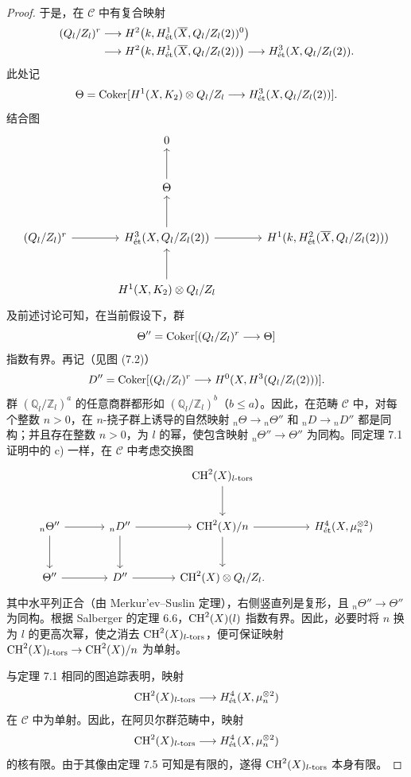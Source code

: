 \begin{proof}
于是，在 $\mathcal C$ 中有复合映射
\[
\begin{split}
 (Q_l/Z_l)^r
 &\longrightarrow H^2\bigl(k,H^1_{\mathrm{\acute et}}(\overline X,Q_l/Z_l(2))^0\bigr)\\
 &\longrightarrow H^2\bigl(k,H^1_{\mathrm{\acute et}}(\overline X,Q_l/Z_l(2))\bigr)
 \longrightarrow H^3_{\mathrm{\acute et}}(X,Q_l/Z_l(2)).
\end{split}
\]
此处记
\[
 \Theta=\operatorname{Coker}[H^1(X,K_2)\otimes Q_l/Z_l
 \longrightarrow H^3_{\mathrm{\acute et}}(X,Q_l/Z_l(2))].
\]
结合图
\[
\resizebox{.98\linewidth}{!}{$
\begin{tikzcd}[ampersand replacement=\&,row sep=large,column sep=large]
 \&0\\
 \&\Theta\arrow[u]\\
 (\mathbb Q_l/\mathbb Z_l)^r\arrow[r]
 \&H^3_{\et}(X,\mathbb Q_l/\mathbb Z_l(2))\arrow[u]\arrow[r]
 \&H^1(k,H^2_{\et}(\overline X,\mathbb Q_l/\mathbb Z_l(2)))\\
 \&H^1(X,\mathcal K_2)\otimes\mathbb Q_l/\mathbb Z_l\arrow[u]
\end{tikzcd}$}
\]
及前述讨论可知，在当前假设下，群
\[
 \Theta''=\operatorname{Coker}[(Q_l/Z_l)^r\longrightarrow\Theta]
\]
指数有界。再记（见图 (7.2)）
\[
 D''=\operatorname{Coker}[(Q_l/Z_l)^r
 \longrightarrow H^0(X,H^3(Q_l/Z_l(2)))].
\]
群 $(\mathbb Q_l/\mathbb Z_l)^a$ 的任意商群都形如 $(\mathbb Q_l/\mathbb Z_l)^b$（$b\le a$）。因此，在范畴 $\mathcal C$ 中，对每个整数 $n>0$，在 $n$-挠子群上诱导的自然映射 ${}_n\Theta\to{}_n\Theta''$ 和 ${}_nD\to{}_nD''$ 都是同构；并且存在整数 $n>0$，为 $l$ 的幂，使包含映射 ${}_n\Theta''\to\Theta''$ 为同构。同定理 7.1 证明中的 c) 一样，在 $\mathcal C$ 中考虑交换图
\[
\begin{tikzcd}[ampersand replacement=\&,column sep=large,row sep=large]
 \&\&\CH^2(X)_{l\text{-}\tors}\arrow[d]\\
 {}_n\Theta''\arrow[r]\arrow[d]\&{}_nD''\arrow[r]\arrow[d]
 \&\CH^2(X)/n\arrow[r]\arrow[d]\&H^4_{\et}(X,\mu_n^{\otimes2})\\
 \Theta''\arrow[r]\&D''\arrow[r]\&\CH^2(X)\otimes\mathbb Q_l/\mathbb Z_l.
\end{tikzcd}
\]
其中水平列正合（由 Merkur'ev--Suslin 定理），右侧竖直列是复形，且 ${}_n\Theta''\to\Theta''$ 为同构。根据 Salberger 的定理 6.6，$\operatorname{CH}^2(X)(l)$ 指数有界。因此，必要时将 $n$ 换为 $l$ 的更高次幂，使之消去 $\operatorname{CH}^2(X)_{l\text{-}\mathrm{tors}}$，便可保证映射 $\operatorname{CH}^2(X)_{l\text{-}\mathrm{tors}}\to\operatorname{CH}^2(X)/n$ 为单射。

与定理 7.1 相同的图追踪表明，映射
\[
 \operatorname{CH}^2(X)_{l\text{-}\mathrm{tors}}\longrightarrow H^4_{\mathrm{\acute et}}(X,\mu_n^{\otimes2})
\]
在 $\mathcal C$ 中为单射。因此，在阿贝尔群范畴中，映射
\[
 \operatorname{CH}^2(X)_{l\text{-}\mathrm{tors}}\longrightarrow H^4_{\mathrm{\acute et}}(X,\mu_n^{\otimes2})
\]
的核有限。由于其像由定理 7.5 可知是有限的，遂得 $\operatorname{CH}^2(X)_{l\text{-}\mathrm{tors}}$ 本身有限。
\end{proof}


